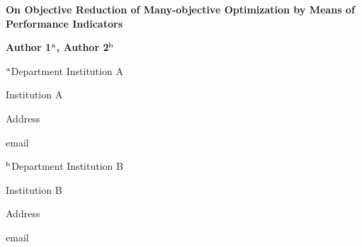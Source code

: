 \documentclass[a4paper,12pt]{article}
\begin{document}
\centerline{\bf On Objective Reduction of Many-objective Optimization by Means of Performance Indicators}

\vspace{12pt}

\centerline{ {\bf Author 1$^{\rm a}$,  {\bf Author 2$^{\rm b}$} } }

\vspace{12pt}

\centerline{$^{\rm a}$Department Institution A}
\centerline{Institution A}
\centerline{Address}
\centerline{email}

\vspace{12pt}

\centerline{$^{\rm b}$Department Institution B}
\centerline{Institution B}
\centerline{Address}
\centerline{email}

\vspace{12pt}
\vspace{12pt}

\end{document}
